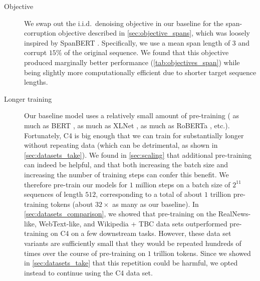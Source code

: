 \documentclass[twoside,11pt]{article}
\begin{document}
\begin{description}

\item[Objective] We swap out the i.i.d.\ denoising objective in our baseline for the span-corruption objective described in \cref{sec:objective_spans}, which was loosely inspired by SpanBERT \citep{joshi2019spanbert}.
Specifically, we use a mean span length of $3$ and corrupt $15\%$ of the original sequence.
We found that this objective produced marginally better performance (\cref{tab:objectives_span}) while being slightly more computationally efficient due to shorter target sequence lengths.

\item[Longer training] Our baseline model uses a relatively small amount of pre-training ( as much as BERT \citep{devlin2018bert},  as much as XLNet \citep{yang2019xlnet},  as much as RoBERTa \citep{liu2019roberta}, etc.).
Fortunately, C4 is big enough that we can train for substantially longer without repeating data (which can be detrimental, as shown in \cref{sec:datasets_take}).
We found in \cref{sec:scaling} that additional pre-training can indeed be helpful, and that both increasing the batch size and increasing the number of training steps can confer this benefit.
We therefore pre-train our models for $1$ million steps on a batch size of $2^{11}$ sequences of length $512$, corresponding to a total of about $1$ trillion pre-training tokens (about $32\times$ as many as our baseline).
In \cref{sec:datasets_comparison}, we showed that pre-training on the RealNews-like, WebText-like, and Wikipedia + TBC data sets outperformed pre-training on C4 on a few downstream tasks.
However, these data set variants are sufficiently small that they would be repeated hundreds of times over the course of pre-training on $1$ trillion tokens.
Since we showed in \cref{sec:datasets_take} that this repetition could be harmful, we opted instead to continue using the C4 data set.


\end{description}
\end{document}
